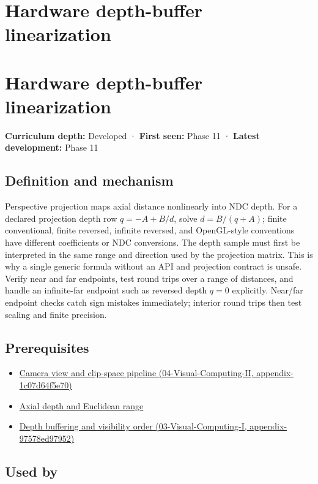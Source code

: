 \hypertarget{appendix-1bc40b08db4a}{}
\section*{Hardware depth-buffer linearization}
\section{Hardware depth-buffer linearization}\label{hardware-depth-buffer-linearization}

\textbf{Curriculum depth:} Developed · \textbf{First seen:} Phase 11 · \textbf{Latest development:} Phase 11

\subsection{Definition and mechanism}\label{definition-and-mechanism}

Perspective projection maps axial distance nonlinearly into NDC depth. For a declared projection depth row \(q=-A+B/d\), solve \(d=B/(q+A)\); finite conventional, finite reversed, infinite reversed, and OpenGL-style conventions have different coefficients or NDC conversions. The depth sample must first be interpreted in the same range and direction used by the projection matrix. This is why a single generic formula without an API and projection contract is unsafe. Verify near and far endpoints, test round trips over a range of distances, and handle an infinite-far endpoint such as reversed depth \(q=0\) explicitly. Near/far endpoint checks catch sign mistakes immediately; interior round trips then test scaling and finite precision.

\subsection{Prerequisites}\label{prerequisites}

\begin{itemize}
\tightlist
\item
  \href{}{Camera view and clip-space pipeline (04-Visual-Computing-II, appendix-1c07d64f5e70)}
\item
  \hyperref[appendix-cac01ebeeb11]{Axial depth and Euclidean range}
\item
  \href{}{Depth buffering and visibility order (03-Visual-Computing-I, appendix-97578ed97952)}
\end{itemize}

\subsection{Used by}\label{used-by}


